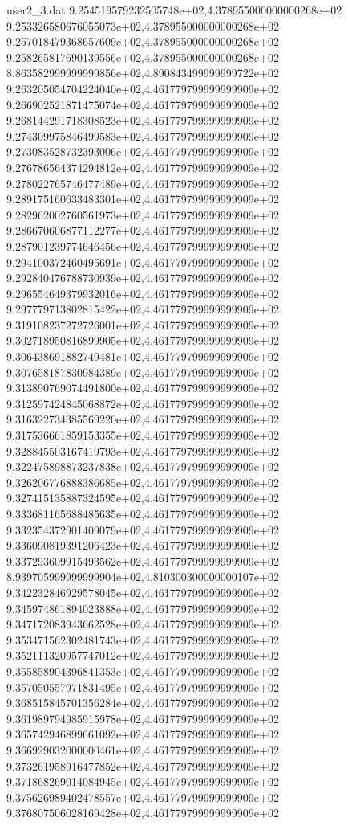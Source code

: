 \begin{filecontents}{user2_3.dat}
9.254519579232505748e+02,4.378955000000000268e+02
9.253326580676055073e+02,4.378955000000000268e+02
9.257018479368657609e+02,4.378955000000000268e+02
9.258265817690139556e+02,4.378955000000000268e+02
8.863582999999999856e+02,4.890843499999999722e+02
9.263205054704224040e+02,4.461779799999999909e+02
9.266902521871475074e+02,4.461779799999999909e+02
9.268144291718308523e+02,4.461779799999999909e+02
9.274309975846499583e+02,4.461779799999999909e+02
9.273083528732393006e+02,4.461779799999999909e+02
9.276786564374294812e+02,4.461779799999999909e+02
9.278022765746477489e+02,4.461779799999999909e+02
9.289175160633483301e+02,4.461779799999999909e+02
9.282962002760561973e+02,4.461779799999999909e+02
9.286670606877112277e+02,4.461779799999999909e+02
9.287901239774646456e+02,4.461779799999999909e+02
9.294100372460495691e+02,4.461779799999999909e+02
9.292840476788730939e+02,4.461779799999999909e+02
9.296554649379932016e+02,4.461779799999999909e+02
9.297779713802815422e+02,4.461779799999999909e+02
9.319108237272726001e+02,4.461779799999999909e+02
9.302718950816899905e+02,4.461779799999999909e+02
9.306438691882749481e+02,4.461779799999999909e+02
9.307658187830984389e+02,4.461779799999999909e+02
9.313890769074491800e+02,4.461779799999999909e+02
9.312597424845068872e+02,4.461779799999999909e+02
9.316322734385569220e+02,4.461779799999999909e+02
9.317536661859153355e+02,4.461779799999999909e+02
9.328845503167419793e+02,4.461779799999999909e+02
9.322475898873237838e+02,4.461779799999999909e+02
9.326206776888386685e+02,4.461779799999999909e+02
9.327415135887324595e+02,4.461779799999999909e+02
9.333681165688485635e+02,4.461779799999999909e+02
9.332354372901409079e+02,4.461779799999999909e+02
9.336090819391206423e+02,4.461779799999999909e+02
9.337293609915493562e+02,4.461779799999999909e+02
8.939705999999999904e+02,4.810300300000000107e+02
9.342232846929578045e+02,4.461779799999999909e+02
9.345974861894023888e+02,4.461779799999999909e+02
9.347172083943662528e+02,4.461779799999999909e+02
9.353471562302481743e+02,4.461779799999999909e+02
9.352111320957747012e+02,4.461779799999999909e+02
9.355858904396841353e+02,4.461779799999999909e+02
9.357050557971831495e+02,4.461779799999999909e+02
9.368515845701356284e+02,4.461779799999999909e+02
9.361989794985915978e+02,4.461779799999999909e+02
9.365742946899661092e+02,4.461779799999999909e+02
9.366929032000000461e+02,4.461779799999999909e+02
9.373261958916477852e+02,4.461779799999999909e+02
9.371868269014084945e+02,4.461779799999999909e+02
9.375626989402478557e+02,4.461779799999999909e+02
9.376807506028169428e+02,4.461779799999999909e+02

\end{filecontents}
